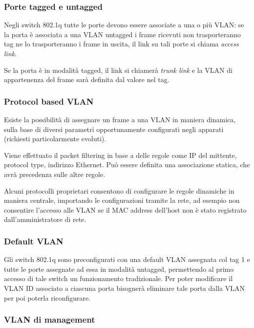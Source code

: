 \documentclass{report}
\begin{document}
\hypertarget{header-n350}{%
\subsubsection{Porte tagged e untagged}\label{header-n350}}

Negli switch 802.1q tutte le porte devono essere associate a una o più
VLAN: se la porta è associata a una VLAN untagged i frame ricevuti non
trasporteranno tag ne lo trasporteranno i frame in uscita, il link su
tali porte si chiama \emph{access link}.

Se la porta è in modalità tagged, il link si chiamerà \emph{trunk link}
e la VLAN di appartenenza del frame sarà definita dal valore nel tag.

\hypertarget{header-n353}{%
\subsubsection{Protocol based VLAN}\label{header-n353}}

Esiste la possibilità di assegnare un frame a una VLAN in maniera
dinamica, sulla base di diversi parametri opportunamente configurati
negli apparati (richiesti particolarmente evoluti).

Viene effettuato il packet filtering in base a delle regole come IP del
mittente, protocol type, indirizzo Ethernet. Può essere definita una
associazione statica, che avrà precedenza sulle altre regole.

Alcuni protocolli proprietari consentono di configurare le regole
dinamiche in maniera centrale, importando le configurazioni tramite la
rete, ad esempio non consentire l'accesso alle VLAN se il MAC address
dell'host non è stato registrato dall'amministratore di rete.

\hypertarget{header-n357}{%
\subsubsection{Default VLAN}\label{header-n357}}

Gli switch 802.1q sono preconfigurati con una default VLAN assegnata col
tag 1 e tutte le porte assegnate ad essa in modalità untagged,
permettendo al primo accesso di tale switch un funzionamento
tradizionale. Per poter modificare il VLAN ID associato a ciascuna porta
bisognerà eliminare tale porta dalla VLAN per poi poterla riconfigurare.

\hypertarget{header-n359}{%
\subsubsection{VLAN di management}\label{header-n359}}
\end{document}
